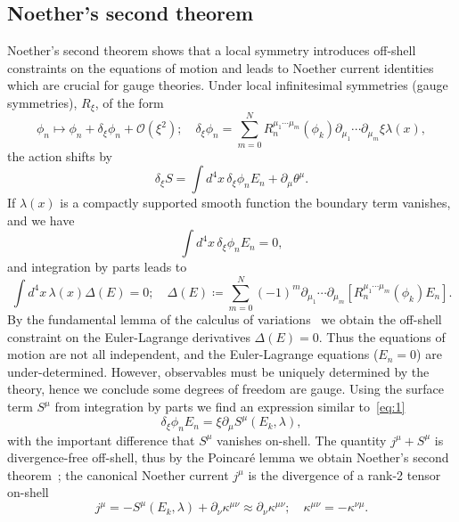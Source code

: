 \documentclass[11pt, a4paper]{article}
\begin{document}
\subsection{Noether's second theorem}
Noether's second theorem shows that a local symmetry introduces off-shell constraints
on the equations of motion and leads to Noether current identities which are
crucial for gauge theories. Under
local infinitesimal symmetries (gauge symmetries), $R_\xi$, of the form
\begin{equation}\label{eq:5}
   \phi_n \mapsto \phi_n + \delta_\xi\phi_n + \mathcal{O}(\xi^2);
   \quad \delta_\xi\phi_n = \sum^N_{m=0}{R^{\mu_1 \cdots \mu_m}_n(\phi_k)
   \partial_{\mu_1}\cdots\partial_{\mu_m} \xi\lambda(x)},
\end{equation}
the action shifts by
\begin{equation}
  \delta_\xi S = \int{d^4x\, \delta_\xi\phi_n E_n + \partial_\mu\theta^\mu}.
\end{equation}
If $\lambda(x)$ is a compactly supported smooth function the boundary term vanishes, and we have
\begin{equation}
  \int{d^4x\, \delta_\xi\phi_n E_n} = 0,
\end{equation}
and integration by parts leads to 
\begin{equation}
  \int{d^4x\, \lambda(x)\Delta(E) } = 0; \quad
  \Delta(E) \coloneq \sum^N_{m=0}{ {(-1)}^m \partial_{\mu_1}\cdots\partial_{\mu_m}
  [R^{\mu_1 \cdots \mu_m}_n(\phi_k) E_n] }. 
\end{equation}
By the fundamental lemma of the calculus of variations~\cite{calcvar} we obtain the 
off-shell constraint on the Euler-Lagrange derivatives $\Delta(E) = 0$.
Thus the equations of motion are not
all independent, and the Euler-Lagrange equations ($E_n = 0$)
are under-determined. However, observables must be uniquely determined
by the theory, hence we conclude some degrees of freedom are gauge. Using
the surface term $S^\mu$ from integration by parts we find an expression similar to~\eqref{eq:1}
\begin{equation}
 \delta_\xi\phi_n E_n = \xi\partial_\mu S^\mu(E_k, \lambda),
\end{equation}
with the important difference that $S^\mu$ vanishes on-shell. The
quantity $j^\mu + S^\mu$ is divergence-free off-shell, thus
by the Poincaré lemma we obtain
Noether's second theorem~\cite{NoetherTran, Noeth2Ward, SuperPot};
the canonical Noether current $j^\mu$ is
the divergence of a rank-2 tensor on-shell
\begin{equation}\label{eq:2}
  j^\mu = -S^\mu(E_k, \lambda) + \partial_\nu \kappa^{\mu\nu}
  \approx \partial_\nu \kappa^{\mu\nu};
  \quad \kappa^{\mu\nu} = -\kappa^{\nu\mu}.
\end{equation}
\end{document}
